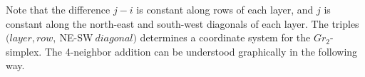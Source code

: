 \documentclass[12 pt]{article}
\theoremstyle{plain}
\theoremstyle{plain}
\theoremstyle{plain}
\theoremstyle{plain}
\theoremstyle{plain}
\theoremstyle{plain}
\theoremstyle{plain}
\theoremstyle{plain}
\theoremstyle{plain}
\theoremstyle{plain}
\theoremstyle{remark}
\theoremstyle{remark}
\theoremstyle{definition}
\theoremstyle{definition}
\theoremstyle{definition}
\newtheorem{example}{Example}[section]
\theoremstyle{definition}
\theoremstyle{definition}
\theoremstyle{definition}
\begin{document}
Note that the difference $j-i$ is constant along rows of each layer, and $j$ is constant along the north-east and south-west diagonals of each layer. The triples $(layer, row,\ $NE-SW$ \ diagonal)$ determines a coordinate system for the $Gr_2$-simplex. The 4-neighbor addition can be understood graphically in the following way.

\end{document}
